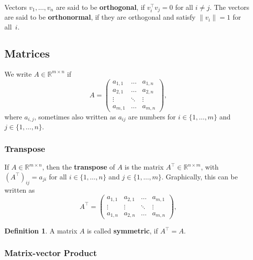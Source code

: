 \documentclass[
  a4paper,
]{article}
\theoremstyle{definition}
\newtheorem{definition}{Definition}[section]
\theoremstyle{definition}
\theoremstyle{definition}
\theoremstyle{definition}
\theoremstyle{remark}
\begin{document}
Vectors \(v_1, \ldots, v_n\) are said to be \textbf{orthogonal},
if \(v_i^\top v_j = 0\) for all \(i \neq j\). The vectors are said to be
\textbf{orthonormal}, if they are orthogonal and satisfy \(\|v_i\| = 1\)
for all~\(i\).

\hypertarget{matrix-rules}{%
\subsection{Matrices}\label{matrix-rules}}

We write \(A \in \mathbb{R}^{m\times n}\) if
\begin{equation*}
  A
  = \begin{pmatrix}
    a_{1,1} & \ldots  & a_{1,n}\\
    a_{2,1} & \ldots  & a_{2,n}\\
    \vdots & \ddots  & \vdots\\
    a_{m,1} & \ldots  & a_{m,n}
  \end{pmatrix},
\end{equation*}
where \(a_{i,j}\), sometimes also written as \(a_{ij}\) are numbers
for \(i \in \{1, \ldots, m\}\) and \(j \in \{1, \ldots, n\}\).

\hypertarget{transpose}{%
\subsubsection{Transpose}\label{transpose}}

If \(A \in \mathbb{R}^{m\times n}\), then the \textbf{transpose} of \(A\) is the matrix
\(A^\top \in \mathbb{R}^{n\times m}\), with \((A^\top)_{ij} = a_{ji}\) for all \(i \in \{1, \ldots, n\}\) and \(j \in \{1, \ldots, m\}\). Graphically,
this can be written as
\begin{equation*}
  A^\top
  = \begin{pmatrix}
    a_{1,1} & a_{2,1} & \ldots  & a_{m,1} \\
    \vdots & \vdots & \ddots  & \vdots \\
    a_{1,n} & a_{2,n} & \ldots  & a_{m,n}
  \end{pmatrix},
\end{equation*}

\begin{definition}
A matrix \(A\) is called \textbf{symmetric}, if \(A^\top = A\).
\end{definition}

\hypertarget{matrix-vector-product}{%
\subsubsection{Matrix-vector Product}\label{matrix-vector-product}}
\end{document}
